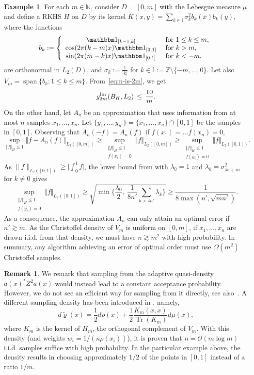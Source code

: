 \documentclass[a4paper,11pt]{article}
\renewcommand{\(}{\left (}
\renewcommand{\)}{\right )}
\newcommand{\<}{\langle}
\renewcommand{\>}{\rangle}
\newcommand{\N}{\mathbb{N}}
\newcommand{\Z}{\mathbb{Z}}
\newcommand{\II}{\mathbb{I}}
\theoremstyle{definition}
\newtheorem{remark}[theorem]{Remark}
\newtheorem{example}[theorem]{Example}
\DeclareMathOperator{\Span}{span}
\DeclareMathOperator{\Tr}{Tr}
\begin{document}
\begin{example}
\label{ex:christoffel}
For each $m\in\N$, consider $D=[0,m]$ with the Lebesgue measure $\mu$
and define a RKHS $H$ on $D$ by its kernel $K(x,y)=\sum_{k\in \II} \sigma_k^2 b_k(x) b_k(y)$, where the functions
\[
b_k := \left\{\begin{array}{cl}
\mathbbm 1_{[k-1,k]}  &\text{ for } 1\leq k\leq m,\\
\cos(2\pi (k-m)x) \mathbbm 1_{[0,1]} &\text{ for } k>m,\\
\sin(2\pi (m-k)x) \mathbbm 1_{[0,1]} &\text{ for } k<-m,\\
\end{array}\right.
\]
are orthonormal in $L_2(D)$,
and $\sigma_k:=\frac1{|k|}$ for $k\in\II:=\Z\setminus\{-m,\dots,0\}$. Let also $V_m=\Span\{b_k \colon 1\leq k\leq m\}$. From~\eqref{eq:n-is-2m}, we get
\[
 g_{2m}^{\rm lin}(B_H,L_2) \,\leq\, \frac{10}m.
\]
On the other hand,
let $A_n$ be an approximation that uses information from at
most $n$ samples $x_1,\hdots,x_n$.
Let $\{y_1,\hdots,y_{n'}\} = \{x_1,\hdots,x_n\} \cap [0,1]$
be the samples in $[0,1]$. Observing that $A_n(-f)=A_n(f)$ if $f(x_1)=\dots f(x_n)=0$,
\[
 \sup_{\Vert f \Vert_H \leq 1} \Vert f - A_n(f) \Vert_{L_2([0,m])}
 \geq \sup_{\substack{\Vert f \Vert_H \leq 1 \\ f(x_i)=0}} \Vert f \Vert_{L_2([0,m])}
 \geq \sup_{\substack{\Vert f \Vert_H \leq 1 \\ f(y_i)=0}} \Vert f \Vert_{L_2([0,1])}.
 \]
As $\|f\|_{L_2([0,1])}\geq \big|\int_0^1f\big|$, the lower bound from \cite[Corollary~2]{KV} with $\lambda_0=1$ and $\lambda_k=\sigma_{|k|+m}^2$ for $k\neq 0$ gives
 \[
\sup_{\substack{\Vert f \Vert_H \leq 1 \\ f(y_i)=0}} \Vert f \Vert_{L_2([0,1])}
 \geq \sqrt{\min\bigg\{\frac{\lambda_0}2, \ \frac{1}{8n'} \sum_{k> 4n'} \lambda_k\bigg\}}
 \geq \frac{1}{8\max(n',\sqrt{mn'})}.
\]
As a consequence, the approximation $A_n$ can only attain an optimal error if $n' \gtrsim m$.
As the Christoffel density of $V_m$ is uniform on $[0,m]$,
if $x_1,\hdots,x_n$ are drawn i.i.d. from that density, 
we must have $n \gtrsim m^2$ with high probability. In summary, any 
algorithm achieving an error of optimal order 
must use $\Omega(m^2)$ Christoffel samples.
\end{example}


\begin{remark}
We remark that sampling from the 
adaptive quasi-density $a(x)^*Z^2a(x)$
would instead lead to a constant acceptance probability. However, we do not see an efficient way for sampling from it 
directly, see also~\cite{ChkifaDolbeault24}.
A different sampling density has been introduced in \cite{KU1},
namely,
\[
 d\tilde\varrho(x) = \frac{1}{2} d\rho(x) + \frac{1}{2} \frac{K_m(x,x)}{\Tr(K_m)} d\mu(x),
\]
where $K_m$ is the kernel of $H_m$, the orthogonal complement of $V_m$.
With this density (and weights $w_i= 1/(n\tilde \rho(x_i))$), 
it is proven that
$n=\mathcal O(m\log m)$ i.i.d. samples suffice with high probability.
In the particular example above,
the density results in choosing approximately $1/2$ of the points in $[0,1]$
instead of a ratio $1/m$.
\end{remark}
\end{document}
